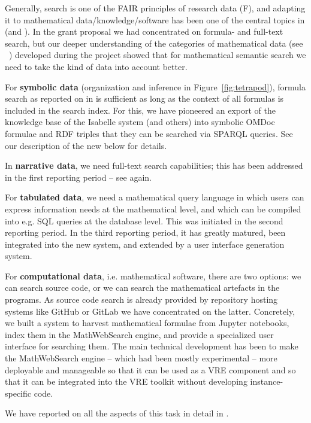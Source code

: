 Generally, search is one of the FAIR principles of research data (F), and adapting it to mathematical data/knowledge/software has been one of the central topics in  (and ). In the grant proposal we had concentrated on formula- and full-text search, but our deeper understanding of the categories of mathematical data (see ~\cite{ODK-D6.10}) developed during the \pn project showed that for mathematical semantic search we need to take the kind of data into account better.
\begin{compactitem}
\item For \textbf{symbolic data} (organization and inference in Figure~\ref{fig:tetrapod}), formula search as reported on in \cite{ODK-D6.1} is sufficient as long as the context of all formulas is included in the search index. For this, we have pioneered an export of the knowledge base of the Isabelle system (and others) into symbolic OMDoc formulae and RDF triples that they can be searched via SPARQL queries. See our description of the new  below for details.
\item In \textbf{narrative data}, we need full-text search capabilities; this has been addressed in the first reporting period -- see \cite{ODK-D6.1} again.
\item For \textbf{tabulated data}, we need a mathematical query language in which users can express information needs at the mathematical level, and which can be compiled into e.g. SQL queries at the database level.
  This was initiated in the second reporting period.
   In the third reporting period, it has greatly matured, been integrated into the new \dmh system, and extended by a user interface generation system.
\item For \textbf{computational data}, i.e. mathematical software, there are two options: we can search source code, or we can search the mathematical artefacts in the programs.
  As source code search is already provided by repository hosting systems like GitHub or GitLab we have concentrated on the latter.
  Concretely, we built a system to harvest mathematical formulae from Jupyter notebooks, index them in the MathWebSearch engine, and provide a specialized user interface for searching them.
  The main technical development has been to make the MathWebSearch engine -- which had been mostly experimental -- more deployable and manageable so that it can be used as a VRE component and so that it can be integrated into the \pn VRE toolkit without developing instance-specific code. 
\end{compactitem}
We have reported on all the aspects of this task in detail in \cite{ODK-D6.10}.
\medskip

